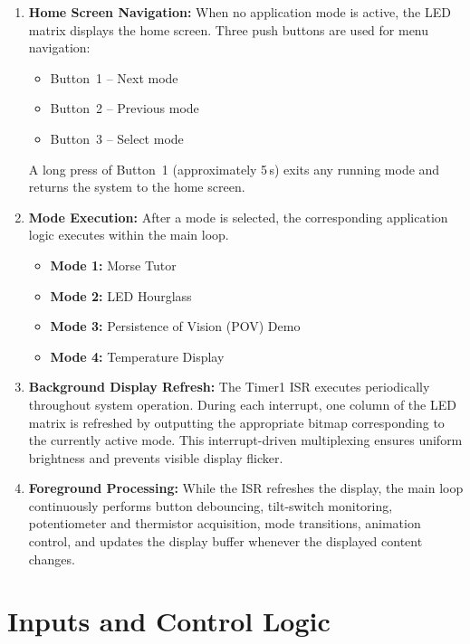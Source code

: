 \documentclass[12pt,a4paper]{article}
\begin{document}
\begin{enumerate}[itemsep=4pt]

\item \textbf{Home Screen Navigation:}
When no application mode is active, the LED matrix displays the home screen. Three push buttons are used for menu navigation:
\begin{itemize}
    \item Button~1 -- Next mode
    \item Button~2 -- Previous mode
    \item Button~3 -- Select mode
\end{itemize}
A long press of Button~1 (approximately 5\,s) exits any running mode and returns the system to the home screen.

\item \textbf{Mode Execution:}
After a mode is selected, the corresponding application logic executes within the main loop.
\begin{itemize}
    \item \textbf{Mode 1:} Morse Tutor
    \item \textbf{Mode 2:} LED Hourglass
    \item \textbf{Mode 3:} Persistence of Vision (POV) Demo
    \item \textbf{Mode 4:} Temperature Display
\end{itemize}

\item \textbf{Background Display Refresh:}
The Timer1 ISR executes periodically throughout system operation. During each interrupt, one column of the LED matrix is refreshed by outputting the appropriate bitmap corresponding to the currently active mode. This interrupt-driven multiplexing ensures uniform brightness and prevents visible display flicker.

\item \textbf{Foreground Processing:}
While the ISR refreshes the display, the main loop continuously performs button debouncing, tilt-switch monitoring, potentiometer and thermistor acquisition, mode transitions, animation control, and updates the display buffer whenever the displayed content changes.

\end{enumerate}
\newpage
\section{Inputs and Control Logic}
\end{document}
